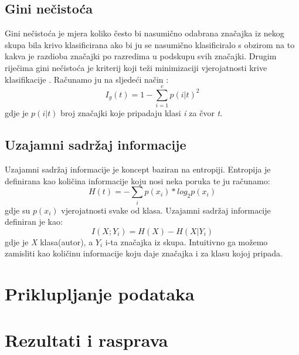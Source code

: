 \subsection{Gini nečistoća}

Gini nečistoća je mjera koliko često bi nasumično odabrana značajka iz nekog skupa bila krivo klasificirana ako bi ju se nasumično klasificiralo s obzirom na to kakva je razdioba značajki po razredima u podskupu svih značajki. Drugim riječima gini nečistoća je kriterij koji teži minimizaciji vjerojatnosti krive klasifikacije \cite{cse}. Računamo ju na sljedeći način \cite{gidef}:
\begin{equation}
	I_g(t) = 1 -  \sum_{i=1}^{c} p(i | t)^{2}
\end{equation}
gdje je $p(i | t)$ broj značajki koje pripadaju klasi \textit{i} za čvor \textit{t}. 

\subsection{Uzajamni sadržaj informacije}

Uzajamni sadržaj informacije je koncept baziran na entropiji. Entropija je definirana kao količina informacije koju nosi neka poruka te ju računamo:
\begin{equation}
		H(t) = - \sum_{i} p(x_{i}) * log_2 p(x_{i})
\end{equation}
gdje su $p(x_{i})$ vjerojatnosti svake od klasa. \newline
Uzajamni sadržaj informacije definiran je kao:
\begin{equation}
		I(X;Y_{i}) = H(X) - H(X | Y_{i})
\end{equation}
gdje je \textit{X} klasa(autor), a $Y_{i}$ i-ta značajka iz skupa. Intuitivno ga možemo zamisliti kao količinu informacije koju daje značajka i za klasu kojoj pripada.

\section{Priklupljanje podataka}

\section{Rezultati i rasprava} \label{results}


